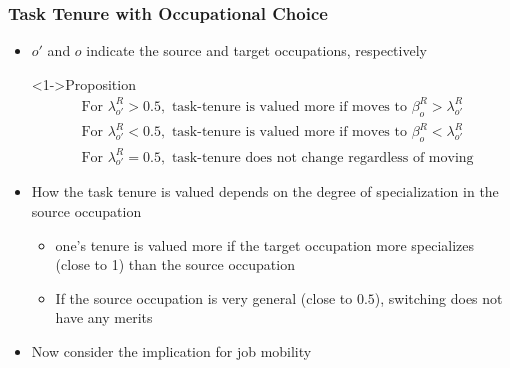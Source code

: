 \documentclass[11pt]{beamer}
\begin{document}
\begin{frame}
	\frametitle{Task Tenure with Occupational Choice}
	\begin{itemize}
		\item $o'$ and $o$ indicate the source and target occupations, respectively
	\begin{block}<1->{Proposition}
\begin{align*}
	&\text{For }\lambda_{o'}^R>0.5,\text{ task-tenure is valued more if moves to }\beta_o^R > \lambda_{o'}^R\\
	&\text{For }\lambda_{o'}^R<0.5,\text{ task-tenure is valued more if moves to }\beta_o^R < \lambda_{o'}^R\\
	&\text{For }\lambda_{o'}^R = 0.5,\text{ task-tenure does not change regardless of moving}
\end{align*}
	\end{block}
		\item How the task tenure is valued depends on the degree of specialization in the source occupation
		\begin{itemize}
			\item one's tenure is valued more if the target occupation more specializes (close to 1) than the source occupation
			\item If the source occupation is very general (close to $0.5$), switching does not have any merits
		\end{itemize}
		\item Now consider the implication for job mobility
	\end{itemize}
\end{frame}
\end{document}
